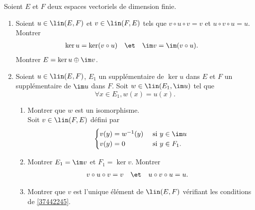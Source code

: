 \begin{enonce}
\begin{exercise}[ID={RMS 122 E250},subtitle={},tags={}, difficulty={0}]
Soient $E$ et $F$ deux espaces vectoriels de dimension finie.
\begin{enumerate}
  \item
	Soient $u\in\lin(E,F)$ et $v\in\lin(F,E)$ tels que $v\circ u\circ v=v$ et $u\circ v\circ u=u$. Montrer
	\begin{align*}
	  \ker u&= \ker(v\circ u)&
	  &\et&
	  \im v&=\im(v\circ u).
	\end{align*}
	Montrer $E=\ker u\oplus\im v$.

  \item
	Soient $u\in\lin(E,F)$, $E_1$ un supplémentaire de $\ker u$ dans $E$ et $F$ un supplémentaire de $\im u$ dans $F$. Soit $w\in\lin(E_1,\im u)$ tel que
	\begin{equation*}
	  \forall x\in E_1, w(x)=u(x).
	\end{equation*}
	\begin{enumerate}
	  \item Montrer que $w$ est un isomorphisme.\\
		Soit $v\in\lin(F,E)$ défini par
		\begin{equation*}
		  \begin{cases}
			v(y)=w^{-1}(y) & \text{ si } y\in\im u\\
			v(y)=0 & \text{ si } y\in F_1.
		  \end{cases}
		\end{equation*}
	  \item \label{37442245}
		Montrer $E_1=\im v$ et $F_1=\ker v$. Montrer
		\begin{align*}
		  v\circ u\circ v&=v&
		  &\et&
		  u\circ v\circ u&= u.
		\end{align*}
	  \item 
		Montrer que $v$ est l'unique élément de $\lin(E,F)$ vérifiant les conditions de \ref{37442245}.
	\end{enumerate}
\end{enumerate}
\end{exercise}
\begin{solution}
\end{solution}
\end{enonce}
